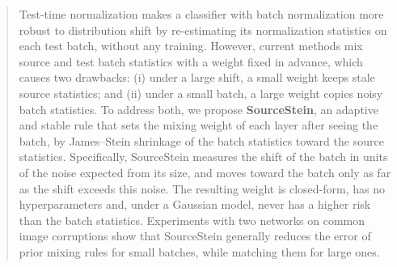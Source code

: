 \begin{abstract}
Test-time normalization makes a classifier with batch normalization more robust to distribution shift by re-estimating its normalization statistics on each test batch, without any training.
However, current methods mix source and test batch statistics with a weight fixed in advance, which causes two drawbacks: (i) under a large shift, a small weight keeps stale source statistics; and (ii) under a small batch, a large weight copies noisy batch statistics.
To address both, we propose \textbf{SourceStein}, an adaptive and stable rule that sets the mixing weight of each layer after seeing the batch, by James--Stein shrinkage of the batch statistics toward the source statistics.
Specifically, SourceStein measures the shift of the batch in units of the noise expected from its size, and moves toward the batch only as far as the shift exceeds this noise.
The resulting weight is closed-form, has no hyperparameters and, under a Gaussian model, never has a higher risk than the batch statistics.
Experiments with two networks on common image corruptions show that SourceStein generally reduces the error of prior mixing rules for small batches, while matching them for large ones.
\end{abstract}
